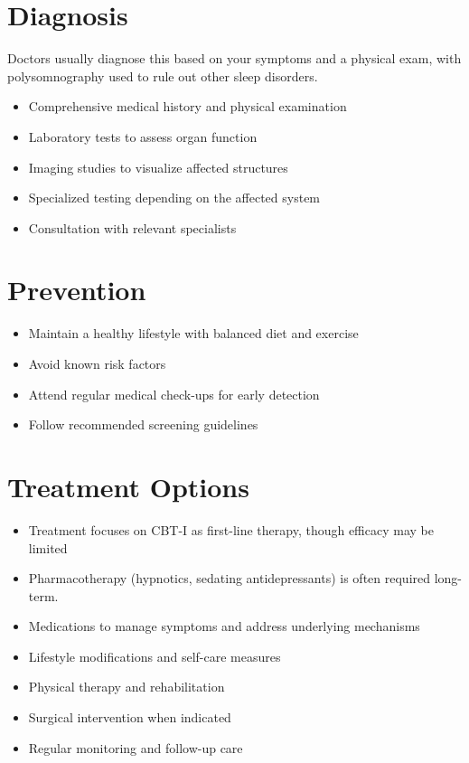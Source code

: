 \section{Diagnosis}
Doctors usually diagnose this based on your symptoms and a physical exam, with polysomnography used to rule out other sleep disorders.

\begin{itemize}[noitemsep]
  \item Comprehensive medical history and physical examination
  \item Laboratory tests to assess organ function
  \item Imaging studies to visualize affected structures
  \item Specialized testing depending on the affected system
  \item Consultation with relevant specialists
\end{itemize}
\section{Prevention}
\begin{itemize}[noitemsep]
  \item Maintain a healthy lifestyle with balanced diet and exercise
  \item Avoid known risk factors
  \item Attend regular medical check-ups for early detection
  \item Follow recommended screening guidelines
\end{itemize}
\section{Treatment Options}
\begin{itemize}[noitemsep]
  \item Treatment focuses on CBT-I as first-line therapy, though efficacy may be limited
  \item Pharmacotherapy (hypnotics, sedating antidepressants) is often required long-term.
  \item Medications to manage symptoms and address underlying mechanisms
  \item Lifestyle modifications and self-care measures
  \item Physical therapy and rehabilitation
  \item Surgical intervention when indicated
  \item Regular monitoring and follow-up care
\end{itemize}
